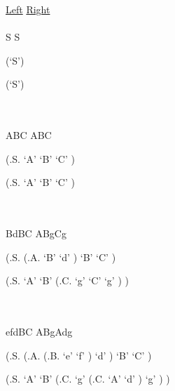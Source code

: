 \documentclass[fleqn]{article}
\begin{document}
\begin{enumerate}
\begin{enumerate}
    \underline{Left} \hspace{0.4\textwidth} \underline{Right}\\\\
    
    S  \hspace{0.42\textwidth} S\\
    \begin{parsetree}
      (`S')
    \end{parsetree}
    \hspace{0.4\textwidth}
    \begin{parsetree}
      (`S')
    \end{parsetree}\\\\

    ABC \hspace{0.4\textwidth} ABC\\
    \begin{parsetree}
      (.S.
        `A'
        `B'
        `C'
      )
    \end{parsetree}
    \hspace{0.35\textwidth}
    \begin{parsetree}
      (.S.
        `A'
        `B'
        `C'
      )
    \end{parsetree}\\\\
    
    BdBC \hspace{0.4\textwidth} ABgCg\\
    \begin{parsetree}
      (.S.
        (.A.
          `B'
          `d'
        )
        `B'
        `C'
      )
    \end{parsetree}
    \hspace{0.30\textwidth}
    \begin{parsetree}
      (.S.
        `A'
        `B'
        (.C.
          `g'
          `C'
          `g'
        )
      )
    \end{parsetree}\\\\
    
    efdBC \hspace{0.4\textwidth} ABgAdg\\
    \begin{parsetree}
      (.S.
        (.A.
          (.B.
            `e'
            `f'
          )
          `d'
        )
        `B'
        `C'
      )
    \end{parsetree}
    \hspace{0.28\textwidth}
    \begin{parsetree}
      (.S.
        `A'
        `B'
        (.C.
          `g'
          (.C.
            `A'
            `d'
          )
          `g'
        )
      )
    \end{parsetree}\\\\
    

\end{enumerate}
\end{enumerate}
\end{document}
